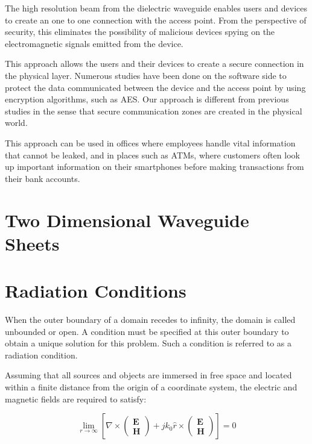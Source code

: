 \documentclass[a4paper,12pt]{report}
\begin{document}
The high resolution beam from the dielectric waveguide
enables users and devices to create an one to one
connection with the access point.
From the perspective of security, this eliminates the possibility of
malicious devices spying on the electromagnetic signals emitted from the device.

This approach allows the users and their devices to create a
secure connection in the physical layer.
Numerous studies have been done on the software side to protect the
data communicated between the device and the access point by using
encryption algorithms, such as AES.
Our approach is different from previous studies
in the sense that secure communication zones are created in the physical world.

This approach can be used in offices where employees handle
vital information that cannot be leaked, and in places such as ATMs,
where customers often look up important information on their
smartphones before making transactions from their bank accounts.

\section{Two Dimensional Waveguide Sheets}

\section{Radiation Conditions}

When the outer boundary of a domain recedes to infinity,
the domain is called unbounded or open.
A condition must be specified at this outer boundary to obtain a unique solution
for this problem.
Such a condition is referred to as a radiation condition.

Assuming that all sources and objects are immersed in free space
and located within a finite distance from the origin of a coordinate system,
the electric and magnetic fields are required to satisfy:

\begin{equation} \label{eq:sommerfeld_radiation_condition_infinite}
  \lim_{r \to \infty}\left[\nabla\times\begin{pmatrix}
    \boldsymbol{E} \\
    \boldsymbol{H}
  \end{pmatrix} + jk_0\hat{r} \times\begin{pmatrix}
    \boldsymbol{E} \\
    \boldsymbol{H}
  \end{pmatrix}\right] = 0
\end{equation}
\end{document}
